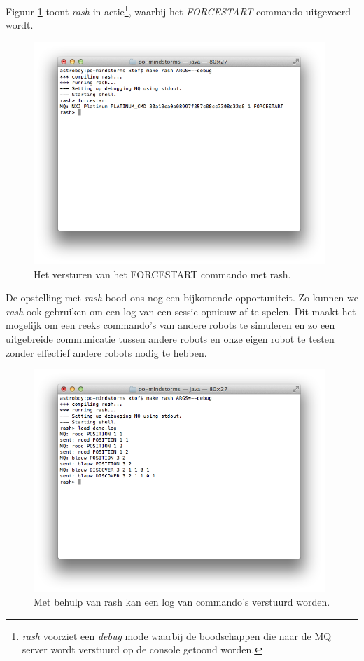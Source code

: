 \documentclass[12pt,a4paper]{report}
\begin{document}
Figuur \ref{fig:rash_forcestart} toont \emph{rash} in actie\footnote{\emph{rash} voorziet een \emph{debug} mode waarbij de boodschappen die naar de MQ server wordt verstuurd op de console getoond worden.}, waarbij het \emph{FORCESTART} commando uitgevoerd wordt.

\begin{figure}[htbp]
  \centering
  \includegraphics[width=110mm]{resources/rash_forcestart.png}
  \caption{Het versturen van het FORCESTART commando met rash.}
  \label{fig:rash_forcestart}
\end{figure}

De opstelling met \emph{rash} bood ons nog een bijkomende opportuniteit. Zo kunnen we \emph{rash} ook gebruiken om een log van een sessie opnieuw af te spelen. Dit maakt het mogelijk om een reeks commando's van andere robots te simuleren en zo een uitgebreide communicatie tussen andere robots en onze eigen robot te testen zonder effectief andere robots nodig te hebben.

\begin{figure}[htbp]
  \centering
  \includegraphics[width=110mm]{resources/rash_load.png}
  \caption{Met behulp van rash kan een log van commando's verstuurd worden.}
  \label{fig:rash_load}
\end{figure}
\end{document}
